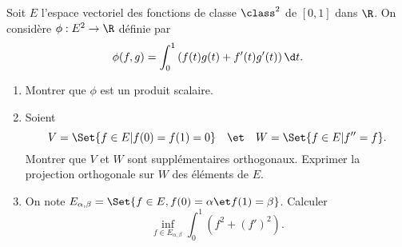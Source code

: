 \begin{enonce}
\begin{exercise}[ID={RMS127 E697},subtitle={Mines-Ponts PSI 2016},tags={}, difficulty={0}]
Soit $E$ l'espace vectoriel des fonctions de classe $\class^2$ de $[0,1]$ dans $\R$.
On considère $\phi:E^2\to\R$ définie par
\begin{equation*}
  \phi(f,g) = \int_0^1 \left( f(t)g(t) + f'(t)g'(t) \right)\d t.
\end{equation*}

\begin{enumerate}
  \item Montrer que $\phi$ est un produit scalaire.

  \item Soient
    \begin{equation*}
      V=\Set{f\in E | f(0) = f(1) = 0}
      \quad\et\quad
      W=\Set{f\in E | f'' = f}.
    \end{equation*}
    Montrer que $V$ et $W$ sont supplémentaires orthogonaux.
    Exprimer la projection orthogonale sur $W$ des éléments de $E$.

  \item On note $E_{\alpha,\beta} = \Set{f\in E, f(0) = \alpha \et f(1)=\beta}$.
    Calculer
    \begin{equation*}
      \inf_{f\in E_{\alpha,\beta}} \int_0^1 \left( f^2 + \left( f' \right)^2 \right).
    \end{equation*}
\end{enumerate}
\end{exercise}
\begin{solution}
\end{solution}
\end{enonce}

